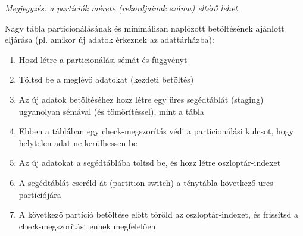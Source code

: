 \documentclass[
  magyar,
]{article}
\providecommand{\tightlist}{%
  \setlength{\itemsep}{0pt}\setlength{\parskip}{0pt}}
\begin{document}
\emph{Megjegyzés: a partíciók mérete (rekordjainak száma) eltérő lehet.}

Nagy tábla particionálásának és minimálisan naplózott betöltésének
ajánlott eljárása (pl. amikor új adatok érkeznek az adattárházba):

\begin{enumerate}
\def\labelenumi{\arabic{enumi}.}
\tightlist
\item
  Hozd létre a particionálási sémát és függvényt
\item
  Töltsd be a meglévő adatokat (kezdeti betöltés)
\item
  Az új adatok betöltéséhez hozz létre egy üres segédtáblát (staging)
  ugyanolyan sémával (és tömörítéssel), mint a tábla
\item
  Ebben a táblában egy check-megszorítás védi a particionálási kulcsot,
  hogy helytelen adat ne kerülhessen be
\item
  Az új adatokat a segédtáblába töltsd be, és hozz létre
  oszloptár-indexet
\item
  A segédtáblát cseréld át (partition switch) a ténytábla következő üres
  partíciójára
\item
  A következő partíció betöltése előtt töröld az oszloptár-indexet, és
  frissítsd a check-megszorítást ennek megfelelően
\end{enumerate}
\end{document}
